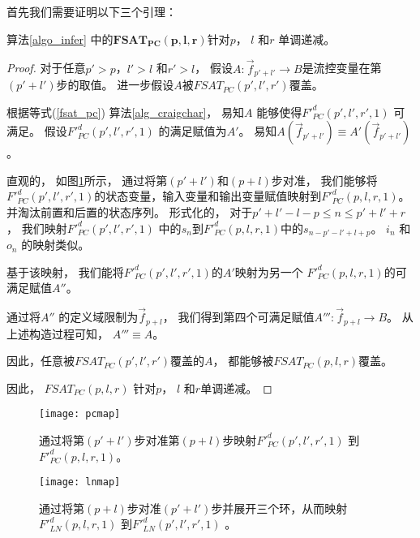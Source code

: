 首先我们需要证明以下三个引理：

\begin{lemma}\label{lemmapcdec}
算法\ref{algo_infer} 中的$\mathbf{FSAT_{PC}(p,l,r)}$针对$p$， $l$ 和$r$ 单调递减。
\end{lemma}
\begin{proof}
对于任意$p'>p$，$l'>l$ 和$r'>l$，
假设$A:\vec{f}_{p'+l'}\to B$是流控变量在第$(p'+l')$步的取值。
进一步假设$A$被$FSAT_{PC}(p',l',r')$覆盖。

根据等式(\ref{fsat_pc}) 算法\ref{alg_craigchar}，
易知$A$ 能够使得$F'^d_{PC}(p',l',r',1)$ 可满足。
假设$F'^d_{PC}(p',l',r',1)$ 的满足赋值为$A'$。
易知$A(\vec{f}_{p'+l'})\equiv A'(\vec{f}_{p'+l'})$。

直观的，
如图\ref{fig_pcmap}所示，
通过将第$(p'+l')$和$(p+l)$步对准，
我们能够将$F'^d_{PC}(p',l',r',1)$的状态变量，输入变量和输出变量赋值映射到$F'^d_{PC}(p,l,r,1)$。
并淘汰前置和后置的状态序列。
形式化的，
对于$p'+l'-l-p\le n\le p'+l'+r$，
我们映射$F'^d_{PC}(p',l',r',1)$ 中的$s_n$到$F'^d_{PC}(p,l,r,1)$中的$s_{n-p'-l'+l+p}$。
$i_n$ 和$o_n$ 的映射类似。

基于该映射，
我们能将$F'^d_{PC}(p',l',r',1)$的$A'$映射为另一个
$F'^d_{PC}(p,l,r,1)$的可满足赋值$A''$。

通过将$A''$ 的定义域限制为$\vec{f}_{p+l}$，
我们得到第四个可满足赋值$A''':\vec{f}_{p+l}\to B$。
从上述构造过程可知，
$A'''\equiv A$。

因此，任意被$FSAT_{PC}(p',l',r')$覆盖的$A$，
都能够被$FSAT_{PC}(p,l,r)$覆盖。

因此，
$FSAT_{PC}(p,l,r)$ 针对$p$， $l$ 和$r$单调递减。
\end{proof}

\begin{figure}[t]
\begin{center}
\texttt{[image: pcmap]}
\end{center}
\caption{通过将第$(p'+l')$步对准第$(p+l)$步映射$F'^d_{PC}(p',l',r',1)$ 到$F'^d_{PC}(p,l,r,1)$。}
  \label{fig_pcmap}
\end{figure}

\begin{figure}[b]
\begin{center}
\texttt{[image: lnmap]}
\end{center}
\caption{通过将第$(p+l)$步对准$(p'+l')$步并展开三个环，从而映射$F'^d_{LN}(p,l,r,1)$ 到$F'^d_{LN}(p',l',r',1)$ 。}
  \label{fig_lnmap}
\end{figure}

